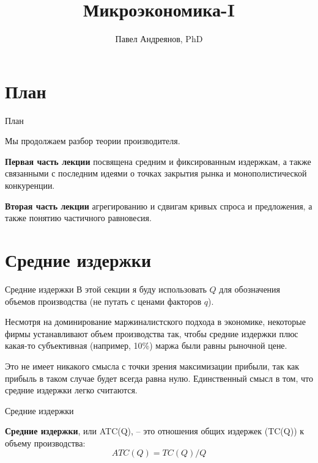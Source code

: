 \documentclass{beamer}
\title{
Микроэкономика-I
}
\author{
Павел Андреянов, PhD
}
\begin{document}
\maketitle

\section{План}

\begin{frame}{План}
	
Мы продолжаем разбор теории производителя.

\textbf{Первая часть лекции} посвящена средним и фиксированным издержкам, а также связанными с последним идеями о точках закрытия рынка и монополистической конкуренции.

\textbf{Вторая часть лекции} агрегированию и сдвигам кривых спроса и предложения, а также понятию частичного равновесия.
	
\end{frame}

\section{Средние издержки}

\begin{frame}{Средние издержки}
В этой секции я буду использовать $Q$ для обозначения объемов производства (не путать с ценами факторов $q$).

Несмотря на доминирование маржиналистского подхода в экономике, некоторые фирмы устанавливают объем производства так, чтобы средние издержки плюс какая-то субъективная (например, 10\%) маржа были равны рыночной цене. 

Это не имеет никакого смысла с точки зрения максимизации прибыли, так как прибыль в таком случае будет всегда равна нулю. Единственный смысл в том, что средние издержки легко считаются.

\end{frame}

\begin{frame}{Средние издержки}

\begin{definition}
\textbf{Средние издержки}, или ATC(Q), – это отношения общих издержек (TC(Q)) к объему производства:
$$ATC(Q) = TC(Q)/Q$$

\end{definition}

\end{frame}
\end{document}

